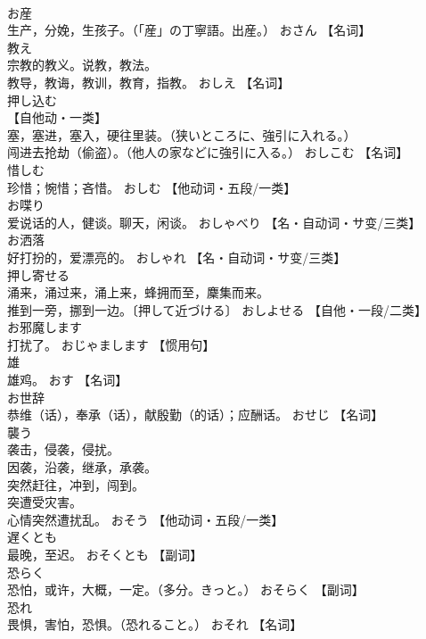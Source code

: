 \documentclass[8pt]{extreport}
\begin{document}
\begin{CJK}{UTF8}{min}
\\	お産	
\\	生产，分娩，生孩子。（「産」の丁寧語。出産。）	おさん		【名词】
\\	教え	
\\	宗教的教义。说教，教法。 
\\	教导，教诲，教训，教育，指教。	おしえ		【名词】
\\	押し込む	
\\	【自他动・一类】 
\\	塞，塞进，塞入，硬往里装。（狭いところに、強引に入れる。） 
\\	闯进去抢劫（偷盗）。（他人の家などに強引に入る。）	おしこむ		【名词】
\\	惜しむ	
\\	珍惜；惋惜；吝惜。	おしむ		【他动词・五段/一类】
\\	お喋り	
\\	爱说话的人，健谈。聊天，闲谈。	おしゃべり		【名・自动词・サ变/三类】
\\	お洒落	
\\	好打扮的，爱漂亮的。	おしゃれ		【名・自动词・サ变/三类】
\\	押し寄せる	
\\	涌来，涌过来，涌上来，蜂拥而至，麇集而来。 
\\	推到一旁，挪到一边。〔押して近づける〕	おしよせる		【自他・一段/二类】
\\	お邪魔します	
\\	打扰了。	おじゃまします		【惯用句】
\\	雄	
\\	雄鸡。	おす		【名词】
\\	お世辞	
\\	恭维（话），奉承（话），献殷勤（的话）；应酬话。	おせじ		【名词】
\\	襲う	
\\	袭击，侵袭，侵扰。 
\\	因袭，沿袭，继承，承袭。 
\\	突然赶往，冲到，闯到。 
\\	突遭受灾害。 
\\	心情突然遭扰乱。	おそう		【他动词・五段/一类】
\\	遅くとも	
\\	最晚，至迟。	おそくとも		【副词】
\\	恐らく	
\\	恐怕，或许，大概，一定。（多分。きっと。）	おそらく		【副词】
\\	恐れ	
\\	畏惧，害怕，恐惧。（恐れること。）	おそれ		【名词】

\end{CJK}
\end{document}
